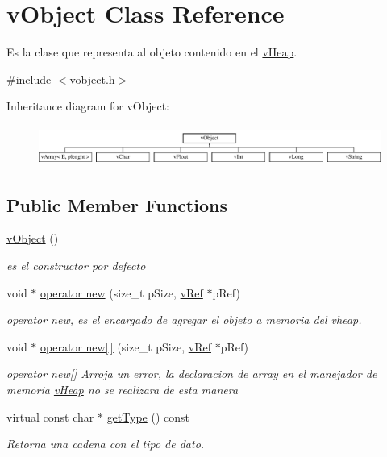 \hypertarget{classv_object}{\section{v\-Object Class Reference}
\label{classv_object}
}


Es la clase que representa al objeto contenido en el \hyperlink{classv_heap}{v\-Heap}.  




{\ttfamily \#include $<$vobject.\-h$>$}

Inheritance diagram for v\-Object\-:\begin{figure}[H]
\begin{center}
\leavevmode
\includegraphics[height=1.314554cm]{classv_object}
\end{center}
\end{figure}
\subsection*{Public Member Functions}
\begin{DoxyCompactItemize}
\item 
\hypertarget{classv_object_af5d1cd42c54c5e33da3dfe5ce747acad}{\hyperlink{classv_object_af5d1cd42c54c5e33da3dfe5ce747acad}{v\-Object} ()}\label{classv_object_af5d1cd42c54c5e33da3dfe5ce747acad}

\begin{DoxyCompactList}\small\item\em es el constructor por defecto \end{DoxyCompactList}\item 
void $\ast$ \hyperlink{classv_object_a5924dc86294ba44958b52131d5de24d8}{operator new} (size\-\_\-t p\-Size, \hyperlink{classv_ref}{v\-Ref} $\ast$p\-Ref)
\begin{DoxyCompactList}\small\item\em operator new, es el encargado de agregar el objeto a memoria del vheap. \end{DoxyCompactList}\item 
void $\ast$ \hyperlink{classv_object_ae5691dee0f1e8f6ba80f44551cc41cc8}{operator new\mbox{[}$\,$\mbox{]}} (size\-\_\-t p\-Size, \hyperlink{classv_ref}{v\-Ref} $\ast$p\-Ref)
\begin{DoxyCompactList}\small\item\em operator new\mbox{[}\mbox{]} Arroja un error, la declaracion de array en el manejador de memoria \hyperlink{classv_heap}{v\-Heap} no se realizara de esta manera \end{DoxyCompactList}\item 
virtual const char $\ast$ \hyperlink{classv_object_a839d2dd4f326f6ae698d832744bf59ce}{get\-Type} () const 
\begin{DoxyCompactList}\small\item\em Retorna una cadena con el tipo de dato. \end{DoxyCompactList}\end{DoxyCompactItemize}
